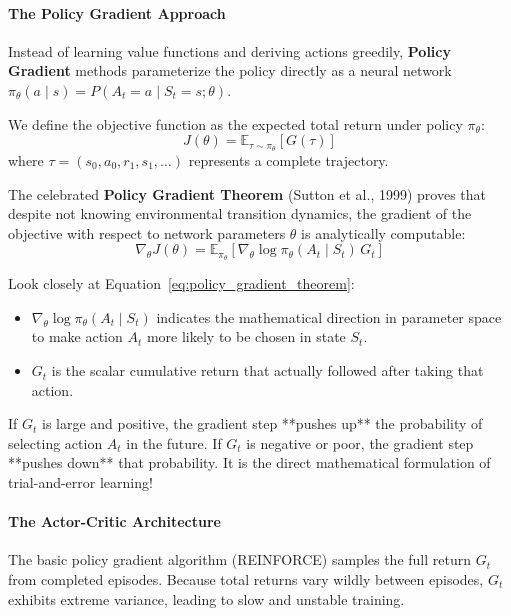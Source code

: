 \paragraph{The Policy Gradient Approach}
Instead of learning value functions and deriving actions greedily, \textbf{Policy Gradient} methods parameterize the policy directly as a neural network $\pi_\theta(a \mid s) = P(A_t = a \mid S_t = s; \theta)$. 

We define the objective function as the expected total return under policy $\pi_\theta$:
\begin{equation}
J(\theta) = \mathbb{E}_{\tau \sim \pi_\theta}[G(\tau)]
\end{equation}
where $\tau = (s_0, a_0, r_1, s_1, \dots)$ represents a complete trajectory. 

The celebrated \textbf{Policy Gradient Theorem} (Sutton et al., 1999) proves that despite not knowing environmental transition dynamics, the gradient of the objective with respect to network parameters $\theta$ is analytically computable:
\begin{equation}
\nabla_\theta J(\theta) = \mathbb{E}_{\pi_\theta}\left[ \nabla_\theta \log \pi_\theta(A_t \mid S_t) \, G_t \right]\label{eq:policy_gradient_theorem}
\end{equation}

\begin{keyidea}
Look closely at Equation~\eqref{eq:policy_gradient_theorem}:
\begin{itemize}
    \item $\nabla_\theta \log \pi_\theta(A_t \mid S_t)$ indicates the mathematical direction in parameter space to make action $A_t$ more likely to be chosen in state $S_t$.
    \item $G_t$ is the scalar cumulative return that actually followed after taking that action.
\end{itemize}
If $G_t$ is large and positive, the gradient step **pushes up** the probability of selecting action $A_t$ in the future. If $G_t$ is negative or poor, the gradient step **pushes down** that probability. It is the direct mathematical formulation of trial-and-error learning!
\end{keyidea}

\paragraph{The Actor-Critic Architecture}
The basic policy gradient algorithm (REINFORCE) samples the full return $G_t$ from completed episodes. Because total returns vary wildly between episodes, $G_t$ exhibits extreme variance, leading to slow and unstable training.

